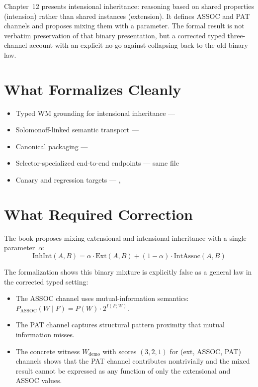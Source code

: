 \documentclass[11pt,openany]{report}
\begin{document}
Chapter~12 presents intensional inheritance: reasoning based on shared
properties (intension) rather than shared instances (extension).
It defines ASSOC and PAT channels and proposes mixing them with a
parameter.  The formal result is not verbatim preservation of that
binary presentation, but a corrected typed three-channel account with
an explicit no-go against collapsing back to the old binary law.

\section{What Formalizes Cleanly}

\begin{itemize}
\item Typed WM grounding for intensional inheritance ---
\item Solomonoff-linked semantic transport ---
\item Canonical  packaging ---
\item Selector-specialized end-to-end endpoints ---
  same file
\item Canary and regression targets ---
  ,
\end{itemize}

\section{What Required Correction}

The book proposes mixing extensional and intensional inheritance with a
single parameter~$\alpha$:
\[
  \mathrm{InhInt}(A, B) = \alpha \cdot \mathrm{Ext}(A, B)
  + (1 - \alpha) \cdot \mathrm{IntAssoc}(A, B)
\]

The formalization shows this binary mixture is explicitly false as a
general law in the corrected typed setting:

\begin{itemize}
\item The ASSOC channel uses mutual-information semantics:
  $P_{\mathrm{ASSOC}}(W \mid F) = P(W) \cdot 2^{I(F;W)}$.
\item The PAT channel captures structural pattern proximity that mutual
  information misses.
\item The concrete witness $W_{\mathrm{demo}}$ with scores $(3, 2, 1)$
  for (ext, ASSOC, PAT) channels shows that the PAT channel contributes
  nontrivially and the mixed result cannot be expressed as any function
  of only the extensional and ASSOC values.
\end{itemize}
\end{document}
